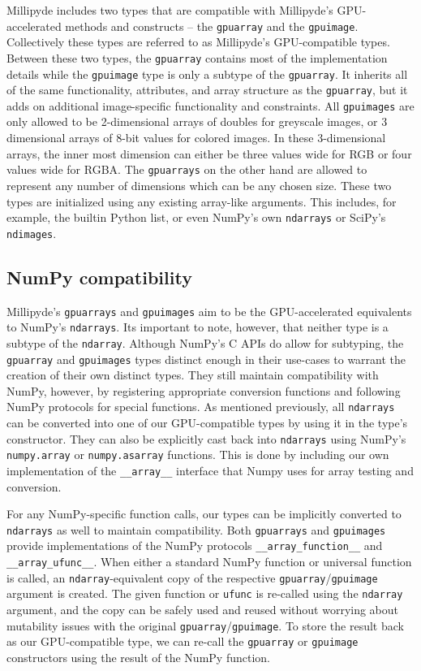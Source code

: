 Millipyde includes two types that are compatible with Millipyde's GPU-accelerated methods and constructs -- the \verb|gpuarray| and the \verb|gpuimage|. Collectively these types are referred to as Millipyde's GPU-compatible types. Between these two types, the \verb|gpuarray| contains most of the implementation details while the \verb|gpuimage| type is only a subtype of the \verb|gpuarray|. It inherits all of the same functionality, attributes, and array structure as the \verb|gpuarray|, but it adds on additional image-specific functionality and constraints. All \verb|gpuimages| are only allowed to be 2-dimensional arrays of doubles for greyscale images, or 3 dimensional arrays of 8-bit values for colored images. In these 3-dimensional arrays, the inner most dimension can either be three values wide for RGB or four values wide for RGBA. The \verb|gpuarrays| on the other hand are allowed to represent any number of dimensions which can be any chosen size. These two types are initialized using any existing array-like arguments. This includes, for example, the builtin Python list, or even NumPy's own \verb|ndarrays| or SciPy's \verb|ndimages|.

\subsection{NumPy compatibility}

Millipyde's \verb|gpuarrays| and \verb|gpuimages| aim to be the GPU-accelerated equivalents to NumPy's \verb|ndarrays|. Its important to note, however, that neither type is a subtype of the \verb|ndarray|. Although NumPy's C APIs do allow for subtyping, the \verb|gpuarray| and \verb|gpuimages| types distinct enough in their use-cases to warrant the creation of their own distinct types. They still maintain compatibility with NumPy, however, by registering appropriate conversion functions and following NumPy protocols for special functions. As mentioned previously, all \verb|ndarrays| can be converted into one of our GPU-compatible types by using it in the type's constructor. They can also be explicitly cast back into \verb|ndarrays| using NumPy's \verb|numpy.array| or \verb|numpy.asarray| functions. This is done by including our own implementation of the \verb|__array__| interface that Numpy uses for array testing and conversion. 

\quad For any NumPy-specific function calls, our types can be implicitly converted to \verb|ndarrays| as well to maintain compatibility. Both \verb|gpuarrays| and \verb|gpuimages| provide implementations of the NumPy protocols \verb|__array_function__| and \verb|__array_ufunc__|. When either a standard NumPy function or universal function is called, an \verb|ndarray|-equivalent copy of the respective \verb|gpuarray|/\verb|gpuimage| argument is created. The given function or \verb|ufunc| is re-called using the \verb|ndarray| argument, and the copy can be safely used and reused without worrying about mutability issues with the original \verb|gpuarray|/\verb|gpuimage|. To store the result back as our GPU-compatible type, we can re-call the \verb|gpuarray| or \verb|gpuimage| constructors using the result of the NumPy function. 

